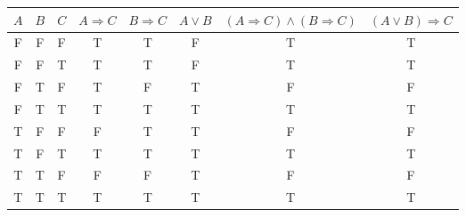 \documentclass[10pt]{article}
\begin{document}
\begin{enumerate}[label={}]
            \begin{tabular}{ |c|c|c|c|c|c|c|c|  }
                  \hline
                  $A$ & $B$ & $C$ & $A \Rightarrow C$ & $B \Rightarrow C$ & $A \vee B$ & $(A \Rightarrow C) \wedge(B \Rightarrow C)$ & $(A \vee B) \Rightarrow C$ \\
                  \hline
                  F   & F   & F   & T                 & T                 & F          & T                                           & T                          \\
                  F   & F   & T   & T                 & T                 & F          & T                                           & T                          \\
                  F   & T   & F   & T                 & F                 & T          & F                                           & F                          \\
                  F   & T   & T   & T                 & T                 & T          & T                                           & T                          \\
                  T   & F   & F   & F                 & T                 & T          & F                                           & F                          \\
                  T   & F   & T   & T                 & T                 & T          & T                                           & T                          \\
                  T   & T   & F   & F                 & F                 & T          & F                                           & F                          \\
                  T   & T   & T   & T                 & T                 & T          & T                                           & T                          \\
                  \hline
            \end{tabular}

\end{enumerate}
\end{document}
